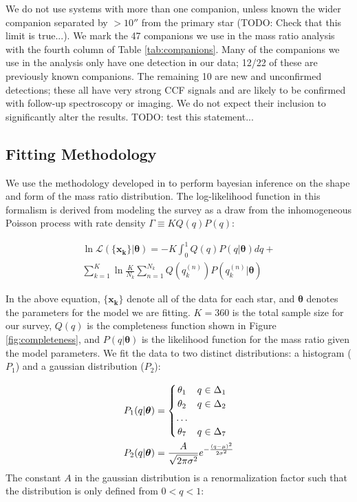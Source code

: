 \documentclass{emulateapj}
\renewcommand{\vec}[1]{\bm{#1}}
\begin{document}
We do not use systems with more than one companion, unless known the wider companion separated by $ > 10''$ from the primary star (TODO: Check that this limit is true...). We mark the 47 companions we use in the mass ratio analysis with the fourth column of Table \ref{tab:companions}. Many of the companions we use in the analysis only have one detection in our data; 12/22 of these are previously known companions. The remaining 10 are new and unconfirmed detections; these all have very strong CCF signals and are likely to be confirmed with follow-up spectroscopy or imaging. We do not expect their inclusion to significantly alter the results. TODO: test this statement...

\subsection{Fitting  Methodology}

We use the methodology developed in \citet{Foreman2014} to perform bayesian inference on the shape and form of the mass ratio distribution. The log-likelihood function in this formalism is derived from modeling the survey as a draw from the inhomogeneous Poisson process with rate density $\Gamma \equiv KQ(q)P(q)$:

\begin{multline}
\ln{\mathcal{L}(\{\vec{x_k}\}| \vec{\theta})} = -K \int_0^1 Q(q)P(q|\vec{\theta})dq + \\ \sum_{k=1}^K \ln{\frac{K}{N_k} \sum_{n=1}^{N_k} Q(q_k^{(n)}) P(q_k^{(n)}|\vec{\theta})}
\label{eqn:money}
\end{multline}

In the above equation, $\{\vec{x_k}\}$ denote all of the data for each star, and $\vec{\theta}$ denotes the parameters for the model we are fitting. $K=360$ is the total sample size for our survey, $Q(q)$ is the completeness function shown in Figure \ref{fig:completeness}, and $P(q|\vec{\theta})$ is the likelihood function for the mass ratio given the model parameters. We fit the data to two distinct distributions: a histogram ($P_1$) and a gaussian distribution ($P_2$):

\begin{align}
 P_1(q|\vec{\theta}) &= \begin{cases}
      \hfill \theta_1 \hfill & q \in \Delta_1 \\
      \hfill \theta_2 \hfill & q \in \Delta_2 \\
      \hfill \ldots \\
      \hfill \theta_7 \hfill & q \in \Delta_7
     \end{cases} \label{eqn:P1} \\
 P_2(q|\vec{\theta}) &= \frac{A}{\sqrt{2\pi\sigma^2}} e^{-\frac{(q - \mu)^2}{2\sigma^2}} \label{eqn:P2}
\end{align}
The constant $A$ in the gaussian distribution is a renormalization factor such that the distribution is only defined from $0 < q < 1$:
\end{document}
